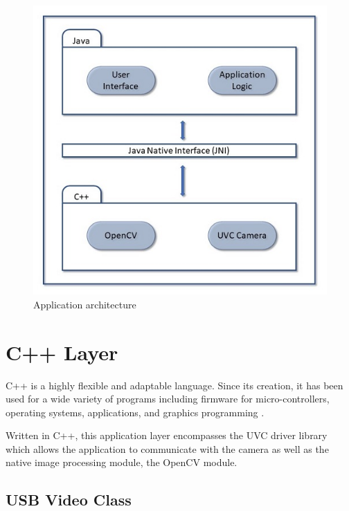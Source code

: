 \begin{figure}[H]
\centering
\includegraphics{figures/applicationArchitecture.JPG}
\caption[Application architecture]{Application architecture}\label{fig:applicationArchitecture}
\end{figure}


\section{C++ Layer}


C++ is a highly flexible and adaptable language. Since its creation, it has been used for a wide variety of programs including firmware for micro-controllers, operating systems, applications, and graphics programming \parencite{cpp}.

Written in C++, this application layer encompasses the UVC driver library which allows the application to communicate with the camera as well as the native image processing module, the OpenCV module.

\subsection{USB Video Class}

